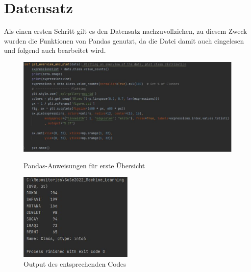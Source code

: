 \documentclass[letterpaper,10pt]{article}
\begin{document}
\section{Datensatz}
    Als einen ersten Schritt gilt es den Datensatz nachzuvollziehen, zu diesem Zweck wurden die Funktionen von Pandas\cite{JeffReback.2020} 
    genutzt, da die Datei damit auch eingelesen und folgend auch bearbeitet wird. 
    \begin{figure}[h]
        \centering
        \includegraphics[width=\textwidth]{Output2.JPG}
        \caption{Pandas-Anweisungen für erste Übersicht}
        \includegraphics[width=0.5\textwidth]{Output1.JPG}
        \caption{Output des entsprechenden Codes}
    \end{figure}
    
\end{document}
